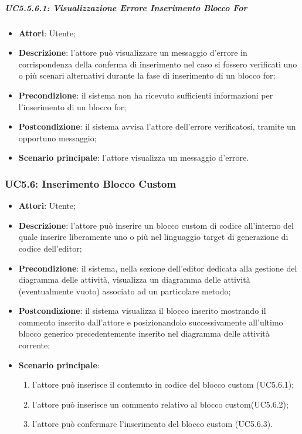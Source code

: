 \subparagraph{UC5.5.6.1: Visualizzazione Errore Inserimento Blocco For}
\label{UC5.5.6.1}
\begin{itemize}
	\item \textbf{Attori}: Utente;
	\item \textbf{Descrizione}: l'attore può visualizzare un messaggio d'errore in corrispondenza della conferma di inserimento nel caso si fossero verificati uno o più scenari alternativi durante la fase di inserimento di un blocco for;
	\item \textbf{Precondizione}: il sistema non ha ricevuto sufficienti informazioni per l'inserimento di un blocco for;
	\item \textbf{Postcondizione}: il sistema avvisa l'attore dell'errore verificatosi, tramite un opportuno messaggio;
	\item \textbf{Scenario principale}: l'attore visualizza un messaggio d'errore.
\end{itemize}

\subsubsection{UC5.6: Inserimento Blocco Custom}
\label{UC5.6}
\begin{itemize}
	\item \textbf{Attori}: Utente;
	\item \textbf{Descrizione}: l'attore può inserire un blocco custom di codice all'interno del quale inserire liberamente uno o più  nel linguaggio target di generazione di codice dell'editor;
	\item \textbf{Precondizione}: il sistema, nella sezione dell'editor dedicata alla gestione del diagramma delle attività, visualizza un diagramma delle attività (eventualmente vuoto) associato ad un particolare metodo;
	\item \textbf{Postcondizione}: il sistema visualizza il blocco inserito mostrando il commento inserito dall'attore e posizionandolo successivamente all'ultimo blocco generico precedentemente
	inserito nel diagramma delle attività corrente;
	\item \textbf{Scenario principale}:
	\begin{enumerate}
		\item l'attore può inserisce il contenuto in codice del blocco custom (UC5.6.1);
		\item l'attore può inserisce un commento relativo al blocco custom(UC5.6.2);
		\item l'attore può confermare l'inserimento del blocco custom (UC5.6.3).
	\end{enumerate}
\end{itemize}

